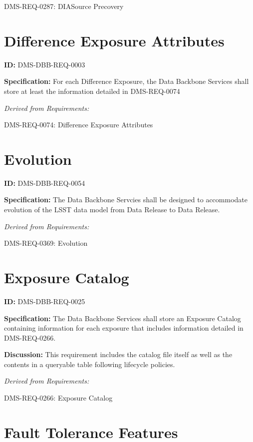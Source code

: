 \documentclass[SE,toc,lsstdraft]{lsstdoc}
\begin{document}
DMS-REQ-0287:
DIASource Precovery \newline

\section{Difference Exposure Attributes}

\label{DMS-DBB-REQ-0003}
\textbf{ID:} DMS-DBB-REQ-0003

\textbf{Specification:}
For each Difference Exposure, the Data Backbone Services shall store at least the information detailed in DMS-REQ-0074

\emph{Derived from Requirements:}

DMS-REQ-0074:
Difference Exposure Attributes \newline

\section{Evolution}

\label{DMS-DBB-REQ-0054}
\textbf{ID:} DMS-DBB-REQ-0054

\textbf{Specification:}
The Data Backbone Servcies shall be designed to accommodate evolution of the LSST data model from Data Release to Data Release.

\emph{Derived from Requirements:}

DMS-REQ-0369:
Evolution \newline

\section{Exposure Catalog}

\label{DMS-DBB-REQ-0025}
\textbf{ID:} DMS-DBB-REQ-0025

\textbf{Specification:}
The Data Backbone Services shall store an Exposure Catalog containing information for each exposure that includes information detailed in DMS-REQ-0266.

\textbf{Discussion:}
This requirement includes the catalog file itself as well as the contents in a queryable table following lifecycle policies.

\emph{Derived from Requirements:}

DMS-REQ-0266:
Exposure Catalog \newline

\section{Fault Tolerance Features}
\end{document}

